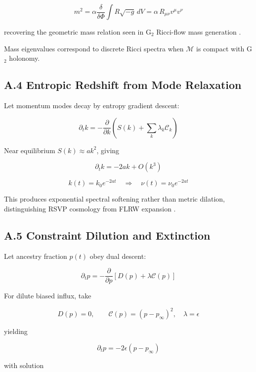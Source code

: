 \documentclass[11pt,a4paper]{article}
\begin{document}
\[
m^2 = \alpha \frac{\delta}{\delta \Phi} \int R \sqrt{-g} \, dV = \alpha\, R_{\mu\nu} v^\mu v^\nu
\]

recovering the geometric mass relation seen in G$_2$ Ricci-flow mass generation \citep{Pincak2025}.

\begin{corollary}
Mass eigenvalues correspond to discrete Ricci spectra when \(\mathcal{M}\) is compact with G$_2$ holonomy.
\end{corollary}

\subsection{A.4 Entropic Redshift from Mode Relaxation}

Let momentum modes decay by entropy gradient descent:

\[
\partial_t k = -\frac{\partial}{\partial k}\left( S(k) + \sum_k \lambda_k \mathcal{C}_k \right)
\]

Near equilibrium \(S(k) \approx a k^2\), giving

\[
\partial_t k = -2 a k + O(k^3)
\]

\[
k(t) = k_0 e^{-2 a t} \quad \Rightarrow \quad \nu(t) = \nu_0 e^{-2 a t}
\]

This produces exponential spectral softening rather than metric dilation, distinguishing RSVP cosmology from FLRW expansion \citep{Turok2012}.

\subsection{A.5 Constraint Dilution and Extinction}

Let ancestry fraction \(p(t)\) obey dual descent:

\[
\partial_t p = -\frac{\partial}{\partial p} \left[ D(p) + \lambda \mathcal{C}(p) \right]
\]

For dilute biased influx, take

\[
D(p) = 0, \qquad \mathcal{C}(p) = (p - p_\infty)^2, \quad \lambda = \epsilon
\]

yielding

\[
\partial_t p = -2 \epsilon (p - p_\infty)
\]

with solution
\end{document}
